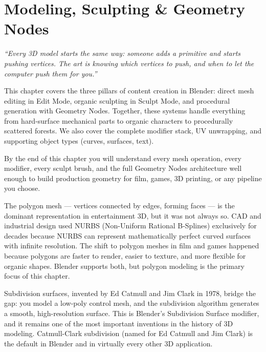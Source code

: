 
\chapter{Modeling, Sculpting \& Geometry Nodes}
\label{ch:modeling}

\begin{quotebox}
\itshape ``Every 3D model starts the same way: someone adds a primitive and starts pushing vertices. The art is knowing which vertices to push, and when to let the computer push them for you.''
\end{quotebox}

\vspace{1em}

This chapter covers the three pillars of content creation in Blender: direct mesh editing in Edit Mode, organic sculpting in Sculpt Mode, and procedural generation with Geometry Nodes. Together, these systems handle everything from hard-surface mechanical parts to organic characters to procedurally scattered forests. We also cover the complete modifier stack, UV unwrapping, and supporting object types (curves, surfaces, text).

By the end of this chapter you will understand every mesh operation, every modifier, every sculpt brush, and the full Geometry Nodes architecture well enough to build production geometry for film, games, 3D printing, or any pipeline you choose.

\begin{historynote}
The polygon mesh --- vertices connected by edges, forming faces --- is the dominant representation in entertainment 3D, but it was not always so. CAD and industrial design used NURBS (Non-Uniform Rational B-Splines) exclusively for decades because NURBS can represent mathematically perfect curved surfaces with infinite resolution. The shift to polygon meshes in film and games happened because polygons are faster to render, easier to texture, and more flexible for organic shapes. Blender supports both, but polygon modeling is the primary focus of this chapter.

Subdivision surfaces, invented by Ed Catmull and Jim Clark in 1978, bridge the gap: you model a low-poly control mesh, and the subdivision algorithm generates a smooth, high-resolution surface. This is Blender's Subdivision Surface modifier, and it remains one of the most important inventions in the history of 3D modeling. Catmull-Clark subdivision (named for Ed Catmull and Jim Clark) is the default in Blender and in virtually every other 3D application.
\end{historynote}


